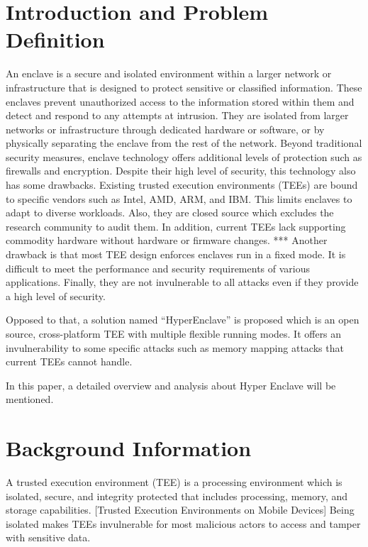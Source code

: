 \section{Introduction and Problem Definition}

An enclave is a secure and isolated environment within a larger network or infrastructure that is designed to protect sensitive or classified information. These enclaves prevent unauthorized access to the information stored within them and detect and respond to any attempts at intrusion. They are isolated from larger networks or infrastructure through dedicated hardware or software, or by physically separating the enclave from the rest of the network. Beyond traditional security measures, enclave technology offers additional levels of protection such as firewalls and encryption. Despite their high level of security, this technology also has some drawbacks. Existing trusted execution environments (TEEs) are bound to specific vendors such as Intel, AMD, ARM, and IBM. This limits enclaves to adapt to diverse workloads. Also, they are closed source which excludes the research community to audit them. In addition, current TEEs lack supporting commodity hardware without hardware or firmware changes. *** Another drawback is that most TEE design enforces enclaves run in a fixed mode. It is difficult to meet the performance and security requirements of various applications. Finally, they are not invulnerable to all attacks even if they provide a high level of security.

Opposed to that, a solution named “HyperEnclave” is proposed which is an open source, cross-platform TEE with multiple flexible running modes. It offers an invulnerability to some specific attacks such as memory mapping attacks that current TEEs cannot handle. 

In this paper, a detailed overview and analysis about Hyper Enclave will be mentioned.


\section{Background Information}
A trusted execution environment (TEE) is a processing environment which is isolated, secure, and integrity protected that includes processing, memory, and storage capabilities. [Trusted Execution Environments on Mobile Devices]
Being isolated makes TEEs invulnerable for most malicious actors to access and tamper with sensitive data.

